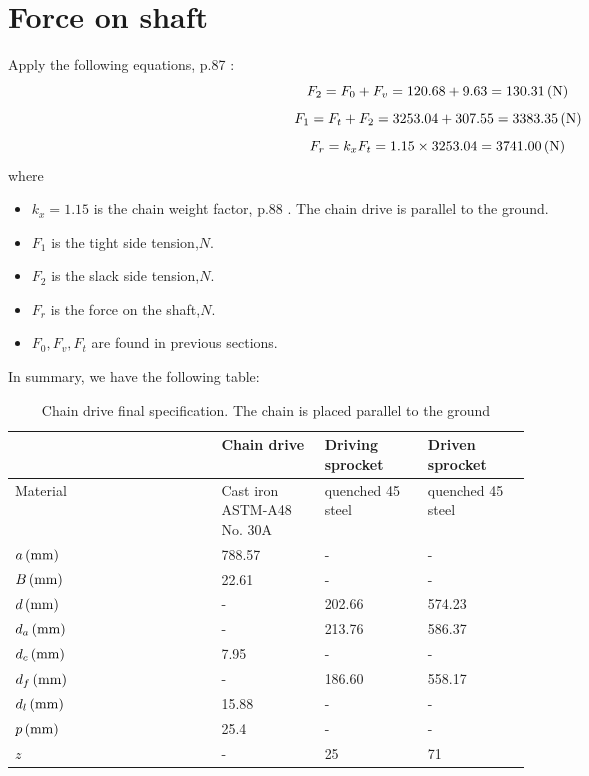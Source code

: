 \section{Force on shaft}
Apply the following equations, p.87 \cite{tk1}:\\
\[ F_2 = F_0 + F_v = 120.68 + 9.63 = 130.31 \, (\mathrm{N})\]
\[ F_1 = F_t + F_2 = 3253.04 + 307.55 = 3383.35 \, (\mathrm{N})\]
\[F_r = k_xF_t = 1.15 \times 3253.04 = 3741.00\, (\mathrm{N})\]
where
\begin{itemize}
	\item $ k_x = 1.15 $ is the chain weight factor, p.88 \cite{tk1}. The chain drive is parallel to the ground.
	\item $ F_1 $ is the tight side tension,$ \unit{N} $.
	\item $ F_2 $ is the slack side tension,$ \unit{N} $.
	\item $ F_r $ is the force on the shaft,$ \unit{N} $.
	\item $ F_0,F_v,F_t $ are found in previous sections.
\end{itemize}

In summary, we have the following table:

\begin{table}[ht]
	\centering
	\caption{Chain drive final specification. The chain is placed parallel to the ground}
	\begin{tabular}{lp{0.2\linewidth}p{0.2\linewidth}p{0.2\linewidth}}\toprule
		& Chain drive & Driving sprocket & Driven sprocket \\ \midrule
		Material	&	Cast iron ASTM-A48 No. 30A	&	quenched 45 steel		&	quenched 45 steel		\\
		$ a\, (\mathrm{mm})    $	&	788.57	&	-		&	-		\\
		$ B\, (\mathrm{mm}) $	&	22.61	&	-		&	-		\\
		$ d\, (\mathrm{mm}) $	&	-		&	202.66	&	574.23	\\
		$ d_a\, (\mathrm{mm}) $	&	-		&	213.76	&	586.37	\\
		$ d_c\, (\mathrm{mm})  $	&	7.95	&	-		&	-		\\
		$ d_f\, (\mathrm{mm})  $	&	-		&	186.60	&	558.17	\\
		$ d_l\, (\mathrm{mm})  $	&	15.88	&	-		&	-		\\
		$ p\, (\mathrm{mm})    $	&	25.4	&	-		&	-		\\
		$ z              $	&	-		&	25		&	71		\\\bottomrule
	\end{tabular}
	\label{chain}
\end{table}